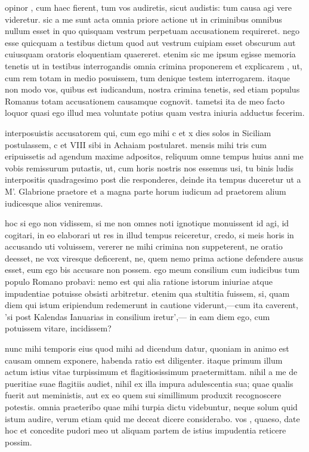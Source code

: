  opinor , cum haec fierent, tum vos audiretis, sicut audistis: tum causa agi vere videretur. sic a me sunt acta omnia priore actione ut in criminibus omnibus nullum esset in quo quisquam vestrum perpetuam accusationem requireret. nego esse quicquam a testibus dictum quod aut vestrum cuipiam esset obscurum aut cuiusquam oratoris eloquentiam quaereret. etenim sic me ipsum egisse memoria tenetis ut in testibus interrogandis omnia crimina proponerem et explicarem , ut, cum rem totam in medio posuissem, tum denique testem interrogarem. itaque non modo vos, quibus est iudicandum, nostra crimina tenetis, sed etiam populus Romanus totam accusationem causamque cognovit. tametsi ita de meo facto loquor quasi ego illud mea voluntate potius quam vestra iniuria adductus fecerim.

 interposuistis accusatorem qui, cum ego mihi c et x dies solos in Siciliam postulassem, c et VIII sibi in Achaiam postularet. mensis mihi tris cum eripuissetis ad agendum maxime adpositos, reliquum omne tempus huius anni me vobis remissurum putastis, ut, cum horis nostris nos essemus usi, tu binis ludis interpositis quadragesimo post die responderes, deinde ita tempus duceretur ut a M'. Glabrione praetore et a magna parte horum iudicum ad praetorem alium iudicesque alios veniremus.

 hoc si ego non vidissem, si me non omnes noti ignotique monuissent id agi, id cogitari, in eo elaborari ut res in illud tempus reiceretur, credo, si meis horis in accusando uti voluissem, vererer ne mihi crimina non suppeterent, ne oratio deesset, ne vox viresque deficerent, ne, quem nemo prima actione defendere ausus esset, eum ego bis accusare non possem. ego meum consilium cum iudicibus tum populo Romano probavi: nemo est qui alia ratione istorum iniuriae atque impudentiae potuisse obsisti arbitretur. etenim qua stultitia fuissem, si, quam diem qui istum eripiendum redemerunt in cautione viderunt,—cum ita caverent, 'si post Kalendas Ianuarias in consilium iretur',— in eam diem ego, cum potuissem vitare, incidissem?

 nunc mihi temporis eius quod mihi ad dicendum datur, quoniam in animo est causam omnem exponere, habenda ratio est diligenter. itaque primum illum actum istius vitae turpissimum et flagitiosissimum praetermittam. nihil a me de pueritiae suae flagitiis audiet, nihil ex illa impura adulescentia sua; quae qualis fuerit aut meministis, aut ex eo quem sui simillimum produxit recognoscere potestis. omnia praeteribo quae mihi turpia dictu videbuntur, neque solum quid istum audire, verum etiam quid me deceat dicere considerabo. vos , quaeso, date hoc et concedite pudori meo ut aliquam partem de istius impudentia reticere possim.


